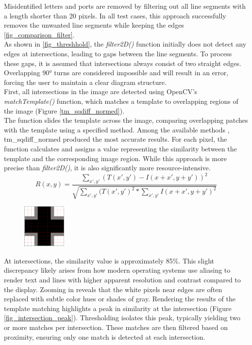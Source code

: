 Misidentified letters and ports are removed by filtering out all line segments with a length shorter than 20 pixels. In all test cases, this approach successfully removes the unwanted line segments while keeping the edges \ref{fig_comparison_filter}.\\
As shown in \ref{fig_threshhold}, the \textit{filter2D()} function initially does not detect any edges at intersections, leading to gaps between the line segments. To process these gaps, it is assumed that intersections always consist of two straight edges. Overlapping 90° turns are considered impossible and will result in an error, forcing the user to maintain a clear diagram structure.\\
First, all intersections in the image are detected using OpenCV's \textit{matchTemplate()} function, which matches a template to overlapping regions of the image (Figure \ref{tm_sqdiff_normed}).\\
The function slides the template across the image, comparing overlapping patches with the template using a specified method. Among the available methods \cite{comparison_methods}, tm\_sqdiff\_normed produced the most accurate results. For each pixel, the function calculates and assigns a value representing the similarity between the template and the corresponding image region. While this approach is more precise than \textit{filter2D()}, it is also significantly more resource-intensive.
\begin{equation}
\label{tm_sqdiff_normed}
    R(x,y) = \frac{\sum_{x', y'}{(T(x', y') - I(x + x', y + y'))^2}}{\sqrt{\sum_{x', y'}{(T(x', y')^2 * \sum_{x', y'}{I(x + x', y + y')^2}}}}
\end{equation}
\begin{figure}
\centering
\includegraphics[width=0.2\textwidth]{Pictures/kernel_intersection.png}
\caption{\label{fig_cross}}
\end{figure}
At intersections, the similarity value is approximately 85\%. This slight discrepancy likely arises from how modern operating systems use aliasing to render text and lines with higher apparent resolution and contrast compared to the display. Zooming in reveals that the white pixels near edges are often replaced with subtle color hues or shades of gray. Rendering the results of the template matching highlights a peak in similarity at the intersection (Figure \ref{fig_intersection_peak}). Thresholding isolates this peak, typically yielding two or more matches per intersection. These matches are then filtered based on proximity, ensuring only one match is detected at each intersection.\\
